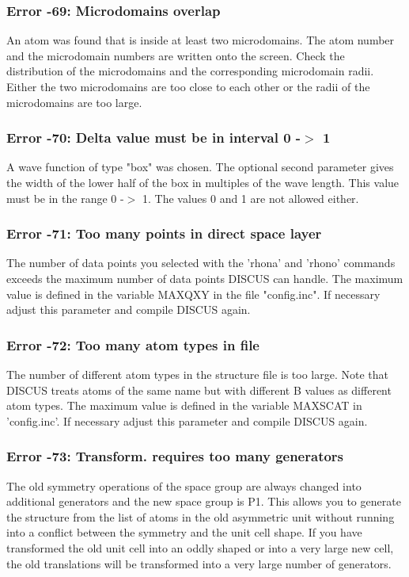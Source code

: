 \subsubsection{Error -69: Microdomains overlap}
\par
An atom was found that is inside at least two microdomains. The atom 
number and the microdomain numbers are written onto the screen. 
Check the distribution of the microdomains and the corresponding 
microdomain radii. Either the two microdomains are too close to each 
other or the radii of the microdomains are too large. 
\subsubsection{Error -70: Delta value must be in interval 0 -$> $ 1}
\par
A wave function of type "box" was chosen. The optional second parameter 
gives the width of the lower half of the box in multiples of the 
wave length. This value must be in the range 0 -$> $ 1. The values 0 and 1 
are not allowed either. 
\subsubsection{Error -71: Too many points in direct space layer}
\par
The number of data points you selected with the 'rhona' and 'rhono' 
commands exceeds the maximum number of data points DISCUS can handle. 
The maximum value is defined in the variable MAXQXY in the file 
"config.inc". If necessary adjust this parameter and compile DISCUS 
again. 
\subsubsection{Error -72: Too many atom types in file}
\par
The number of different atom types in the structure file is too 
large. Note that DISCUS treats atoms of the same name but with 
different B values as different atom types. The maximum value 
is defined in the variable MAXSCAT in 'config.inc'. If necessary 
adjust this parameter and compile DISCUS again. 
\subsubsection{Error -73: Transform. requires too many generators}
\par
The old symmetry operations of the space group are always changed into 
additional generators and the new space group is P1. This allows you 
to generate the structure from the list of atoms in the old asymmetric 
unit without running into a conflict between the symmetry and the 
unit cell shape. 
If you have transformed the old unit cell into an oddly shaped or into 
a very large new cell, the old translations will be transformed into 
a very large number of generators. 
